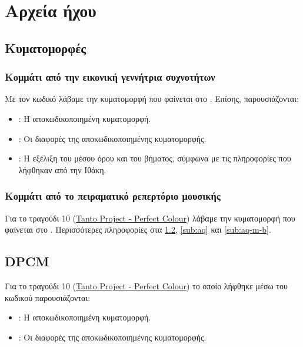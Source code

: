 \section{Αρχεία ήχου}
\subsection{Κυματομορφές}
    \subsubsection{Κομμάτι από την εικονική γεννήτρια συχνοτήτων}
    Με τον κωδικό \Rcode{} λάβαμε την κυματομορφή που φαίνεται στο
    .
    Επίσης, παρουσιάζονται:
    \begin{itemize}
    \item {}:
    Η αποκωδικοποιημένη κυματομορφή.
    \item {}:
    Οι διαφορές της αποκωδικοποιημένης κυματομορφής.
    \item {}:
    Η εξέλιξη του μέσου όρου και του βήματος, σύμφωνα με τις πληροφορίες που λήφθηκαν από την Ιθάκη.
    \end{itemize}
    \FloatBarrier
    \subsubsection{Κομμάτι από το πειραματικό ρεπερτόριο μουσικής}
    Για το τραγούδι 10 (\href{https://www.youtube.com/watch?v=raK2GNAFhJY}{Tanto Project - Perfect Colour})
    λάβαμε την κυματομορφή που φαίνεται στο .
    Περισσότερες πληροφορίες στα \ref{sub:dpcm}, \ref{sub:aq} και \ref{sub:aq-m-b}.
\subsection{DPCM}\label{sub:dpcm}
    Για το τραγούδι 10 (\href{https://www.youtube.com/watch?v=raK2GNAFhJY}{Tanto Project - Perfect Colour}) το οποίο λήφθηκε μέσω του κωδικού \Dcode{} παρουσιάζονται:
    \begin{itemize}
    \item {}:
    Η αποκωδικοποιημένη κυματομορφή.
    \item {}:
    Οι διαφορές της αποκωδικοποιημένης κυματομορφής.
    \end{itemize}

